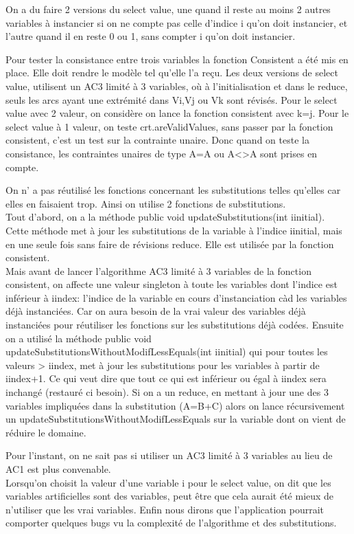 On a du faire 2 versions du select value, une quand il reste au moins 2 autres variables à instancier si on ne compte pas celle d'indice i qu'on doit instancier, et l'autre quand il en reste 0 ou 1, sans compter i qu'on doit instancier.
     

 Pour tester la consistance entre trois variables  la fonction Consistent a été mis en place. Elle doit rendre le modèle tel qu'elle l'a reçu.
 Les deux versions de  select value, utilisent un AC3 limité à 3 variables, où à l'initialisation et dans le reduce, seuls les arcs ayant une extrémité dans Vi,Vj ou Vk sont révisés.
 Pour le select value avec 2 valeur, on considère on lance la fonction consistent avec k=j.
Pour le select value à 1 valeur, on teste crt.areValidValues, sans passer par la fonction consistent, c'est un test sur la contrainte unaire.
Donc quand on teste la consistance, les contraintes unaires de type A=A ou  A<>A sont prises en compte.


On n’ a pas réutilisé les fonctions concernant les substitutions telles qu'elles car elles en faisaient trop. Ainsi on utilise 2 fonctions de substitutions.\\
Tout d'abord, on a la méthode public void updateSubstitutions(int iinitial).\\
Cette méthode met à jour les substitutions de la variable à l'indice iinitial, mais en une seule fois sans faire de révisions reduce. Elle est utilisée par la fonction consistent.\\
Mais avant de lancer l'algorithme AC3 limité à 3 variables de la fonction consistent, on affecte une valeur singleton à toute les variables dont l'indice est inférieur à iindex: l'indice de la variable en cours d'instanciation càd les variables déjà instanciées.
Car on aura besoin de la vrai valeur des variables déjà instanciées pour réutiliser les fonctions sur les substitutions déjà codées.
Ensuite on a utilisé la méthode public void updateSubstitutionsWithoutModifLessEquals(int iinitial) qui pour toutes les valeurs > iindex, met à jour les substitutions pour les variables à partir de iindex+1. Ce qui veut dire que tout ce qui est inférieur ou égal à iindex sera inchangé (restauré ci besoin).
Si on a un reduce, en mettant à jour une des 3 variables impliquées dans la substitution (A=B+C) alors on lance récursivement un
updateSubstitutionsWithoutModifLessEquals sur la variable dont on vient de réduire le domaine.

      
Pour l’instant, on ne sait pas si utiliser un AC3 limité à 3 variables au lieu de  AC1 est plus convenable.\\
Lorsqu'on choisit la valeur d'une variable i pour le select value, on dit que les variables artificielles sont des variables, peut être que cela aurait été mieux de n'utiliser que les vrai variables. 
Enfin nous dirons que l’application pourrait comporter quelques bugs vu la complexité de l'algorithme et des substitutions.
